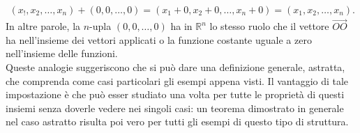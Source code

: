 \begin{eqnarray}
  \label{eq:spaziovect3}
  (x_!,x_2,\dots, x_n)+(0,0,\dots,0)=(x_1+0,x_2+0,\dots,x_n+0)=(x_1,x_2,\dots,x_n).
\end{eqnarray}
In altre parole, la $n$-upla $(0,0,\dots,0)$ ha in $\mathds{R}^n$ lo stesso ruolo che il vettore $\vec{OO}$ ha nell'insieme dei vettori applicati o la funzione costante uguale a zero nell'insieme delle funzioni.\\
Queste analogie suggeriscono che si può dare una definizione generale, astratta, che comprenda come casi particolari gli esempi appena visti. Il vantaggio di tale impostazione è che può esser studiato una volta per tutte le proprietà di questi insiemi senza doverle vedere nei singoli casi: un teorema dimostrato in generale nel caso astratto risulta poi vero per tutti gli esempi di questo tipo di struttura.
